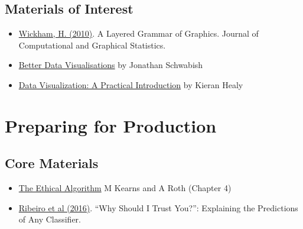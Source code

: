 \documentclass[
  letterpaper,
  DIV=11,
  numbers=noendperiod]{scrreprt}
\providecommand{\tightlist}{%
  \setlength{\itemsep}{0pt}\setlength{\parskip}{0pt}}\usepackage{longtable,booktabs,array}
\begin{document}
\subsection*{Materials of Interest}\label{materials-of-interest-2}

\begin{itemize}
\item
  \href{https://library-search.imperial.ac.uk/discovery/fulldisplay?docid=cdi_informaworld_taylorfrancis_310_1198_jcgs_2009_07098&context=PC&vid=44IMP_INST:ICL_VU1&lang=en&search_scope=MyInst_and_CI&adaptor=Primo\%20Central&tab=Everything&query=any,contains,layered\%20grammar\%20of\%20graphics&offset=0}{Wickham,
  H. (2010)}. A Layered Grammar of Graphics. Journal of Computational
  and Graphical Statistics.
\item
  \href{https://library-search.imperial.ac.uk/discovery/fulldisplay?docid=alma991000664639501591&context=L&vid=44IMP_INST:ICL_VU1&lang=en&search_scope=MyInst_and_CI&adaptor=Local\%20Search\%20Engine&tab=Everything&query=any,contains,better\%20data\%20visualisations&offset=0}{Better
  Data Visualisations} by Jonathan Schwabish
\end{itemize}

\begin{itemize}
\tightlist
\item
  \href{https://library-search.imperial.ac.uk/discovery/fulldisplay?docid=alma991000211295101591&context=L&vid=44IMP_INST:ICL_VU1&lang=en&search_scope=MyInst_and_CI&adaptor=Local\%20Search\%20Engine&tab=Everything&query=any,contains,Data\%20Visualization\%20\%E2\%80\%93\%20A\%20Practical\%20Introduction&offset=0}{Data
  Visualization: A Practical Introduction} by Kieran Healy
\end{itemize}

\section{Preparing for Production}\label{production-reading}

\subsection*{Core Materials}\label{core-materials-3}

\begin{itemize}
\item
  \href{https://library-search.imperial.ac.uk/discovery/fulldisplay?docid=alma991000531083101591&context=L&vid=44IMP_INST:ICL_VU1&lang=en&search_scope=MyInst_and_CI&adaptor=Local\%20Search\%20Engine&tab=Everything&query=any,contains,kearns\%20and\%20roth&mode=Basic}{The
  Ethical Algorithm} M Kearns and A Roth (Chapter 4)
\item
  \href{https://arxiv.org/abs/1602.04938}{Ribeiro et al (2016)}. ``Why
  Should I Trust You?'': Explaining the Predictions of Any Classifier.
\end{itemize}
\end{document}
